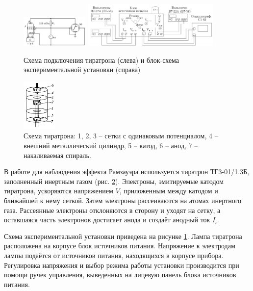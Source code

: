 \documentclass[a4paper, 12pt]{article}
\begin{document}
    \begin{figure}[H]
        \centering
        \includegraphics[width = 0.3\textwidth]{images/schm1.png}
        \includegraphics[width = 0.6\textwidth]{images/schm2.png}
        \caption{Схема подключения тиратрона (слева) и блок-схема экспериментальной установки (справа)}
        \label{img:exp_scheme}
    \end{figure}

    \begin{figure}
        \centering
        \includegraphics[width = 0.15\textwidth]{images/tiratron.png}
        \caption{Схема тиратрона: 1, 2, 3 -- сетки с одинаковым потенциалом, 4 -- внешний металлический цилиндр, 5 -- катод, 6 -- анод, 7 -- накаливаемая спираль.}
        \label{img:tiratron}
    \end{figure}

    В работе для наблюдения эффекта Рамзауэра используется тиратрон ТГ3-01/1.3Б, заполненный инертным газом (рис. \ref{img:tiratron}). Электроны, эмитируемые катодом тиратрона, ускоряются напряжением $V$, приложенным между катодом и ближайшей к нему сеткой. Затем электроны рассеиваются на атомах инертного газа. Рассеянные электроны отклоняются в сторону и уходят на сетку, а оставшаяся часть электронов достигает анода и создаёт анодный ток $I_а$.

    Схема экспериментальной установки приведена на рисунке \ref{img:exp_scheme}. Лампа тиратрона расположена на корпусе блок источников питания. Напряжение к электродам лампы подаётся от источников питания, находящихся в корпусе прибора. Регулировка напряжения и выбор режима работы установки производится при помощи ручек управления, выведенных на лицевую панель блока источников питания.
\end{document}

